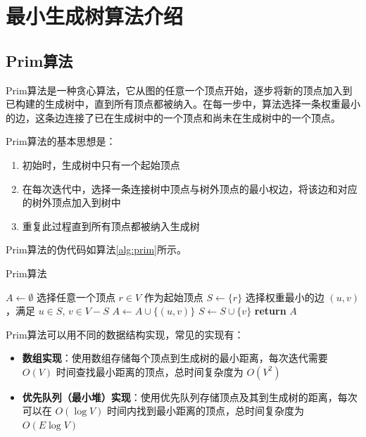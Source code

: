 \documentclass[a4paper,12pt]{ctexart}
\begin{document}
\section{最小生成树算法介绍}
\subsection{Prim算法}
Prim算法是一种贪心算法，它从图的任意一个顶点开始，逐步将新的顶点加入到已构建的生成树中，直到所有顶点都被纳入。在每一步中，算法选择一条权重最小的边，这条边连接了已在生成树中的一个顶点和尚未在生成树中的一个顶点。

Prim算法的基本思想是：
\begin{enumerate}
    \item 初始时，生成树中只有一个起始顶点
    \item 在每次迭代中，选择一条连接树中顶点与树外顶点的最小权边，将该边和对应的树外顶点加入到树中
    \item 重复此过程直到所有顶点都被纳入生成树
\end{enumerate}

Prim算法的伪代码如算法\ref{alg:prim}所示。

\begin{algorithm}
    \caption{Prim算法}\label{alg:prim}
    \begin{algorithmic}[1]
    \State $A \gets \emptyset$ 
    \State 选择任意一个顶点 $r \in V$ 作为起始顶点
    \State $S \gets \{r\}$ 
        \State 选择权重最小的边 $(u,v)$，满足 $u \in S$, $v \in V-S$
        \State $A \gets A \cup \{(u,v)\}$ 
        \State $S \gets S \cup \{v\}$ 
    \EndWhile
    \State \textbf{return} $A$ 
    \EndProcedure
    \end{algorithmic}
\end{algorithm}

Prim算法可以用不同的数据结构实现，常见的实现有：
\begin{itemize}
    \item \textbf{数组实现}：使用数组存储每个顶点到生成树的最小距离，每次迭代需要 $O(V)$ 时间查找最小距离的顶点，总时间复杂度为 $O(V^2)$
    \item \textbf{优先队列（最小堆）实现}：使用优先队列存储顶点及其到生成树的距离，每次可以在 $O(\log V)$ 时间内找到最小距离的顶点，总时间复杂度为 $O(E \log V)$
\end{itemize}
\end{document}
